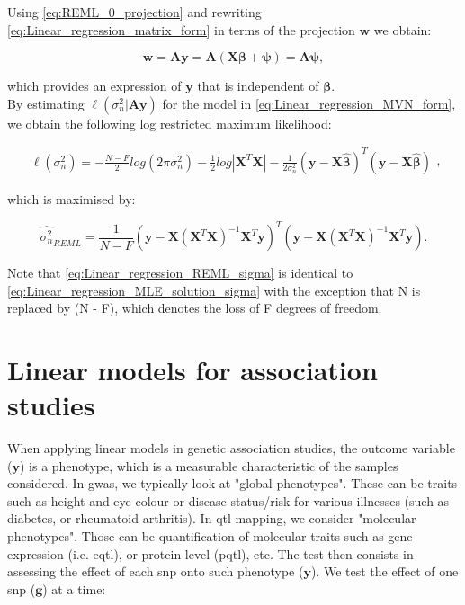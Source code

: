 Using \eqref{eq:REML_0_projection} and rewriting \eqref{eq:Linear_regression_matrix_form} in terms of the projection $\mathbf{w}$ we obtain:

\begin{equation}\label{eq:REML_w_projection}
    \mathbf{w} = \mathbf{A}\mathbf{y} = \mathbf{A}(\mathbf{X}\boldsymbol{\beta} + \boldsymbol{\psi}) = \mathbf{A}\boldsymbol{\psi},
\end{equation}

which provides an expression of $\mathbf{y}$ that is independent of $\boldsymbol{\beta}$.\\

By estimating $\ell(\sigma_n^2 | \mathbf{A}\mathbf{y} )$ for the model in \eqref{eq:Linear_regression_MVN_form}, we obtain the following log restricted maximum likelihood:

\begin{equation} \label{eq:Linear_regression_log_restricted_likelihood}
\begin{split}
\ell(\sigma_n^2) = -\frac{N-F}{2}log(2\pi\sigma_n^2) - \frac{1}{2}log|\mathbf{X}^T\mathbf{X}| 
- \frac{1}{2\sigma_n^2}(\mathbf{y}-\mathbf{X}\hat{\boldsymbol{\beta}})^T(\mathbf{y}-\mathbf{X}\hat{\boldsymbol{\beta}})  
\end{split},
\end{equation}

which is maximised by:

\begin{equation}\label{eq:Linear_regression_REML_sigma}
\hat{\sigma_n^2}_{REML} =  \frac{1}{N-F}(\mathbf{y}-\mathbf{X}(\mathbf{X}^T\mathbf{X})^{-1}\mathbf{X}^T\mathbf{y})^T(\mathbf{y}-\mathbf{X}(\mathbf{X}^T\mathbf{X})^{-1}\mathbf{X}^T\mathbf{y}).
\end{equation}

Note that \eqref{eq:Linear_regression_REML_sigma} is identical to \eqref{eq:Linear_regression_MLE_solution_sigma} with the exception that N is replaced by (N - F), which denotes the loss of F degrees of freedom.


\section{Linear models for association studies}

When applying linear models in genetic association studies, the outcome variable ($\mathbf{y}$) is a phenotype, which is a measurable characteristic of the samples considered. 
In \gls{gwas}, we typically look at "global phenotypes".
These can be traits such as height and eye colour or disease status/risk for various illnesses (such as diabetes, or rheumatoid arthritis).
In \gls{qtl} mapping, we consider "molecular phenotypes". 
Those can be quantification of molecular traits such as gene expression (i.e. e\gls{qtl}), or protein level (p\gls{qtl}), etc.
The test then consists in assessing the effect of each \gls{snp} onto such phenotype ($\mathbf{y}$). 
We test the effect of one \gls{snp} ($\mathbf{g}$) at a time:

